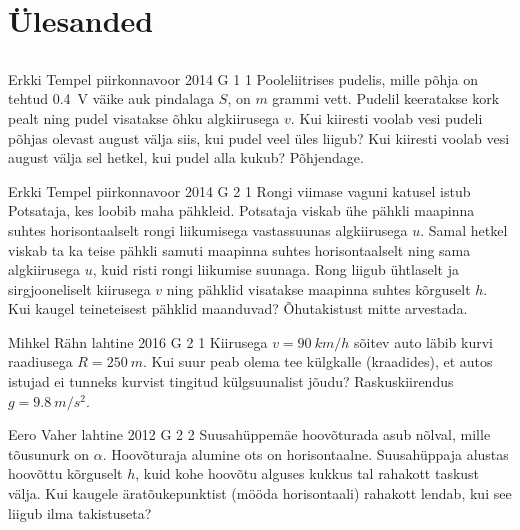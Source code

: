 \documentclass[11pt]{article}
\begin{document}
{        \section{Ülesanded}
        \ToggleStatement
        \subsection{\protect{}}

\graphicspath{{../problems/}}

{Erkki Tempel} %
{piirkonnavoor} %
{2014} %
{G 1} %
{1} %
{
\ifStatement
Pooleliitrises pudelis, mille põhja on tehtud \SI{0.4}{V} väike auk pindalaga $S$, on $m$ grammi vett. Pudelil keeratakse kork pealt ning pudel visatakse õhku algkiirusega $v$. Kui kiiresti voolab vesi pudeli põhjas olevast august välja siis, kui pudel veel üles liigub? Kui kiiresti voolab vesi august välja sel hetkel, kui pudel alla kukub? Põhjendage.
\fi
}

{Erkki Tempel} %
{piirkonnavoor} %
{2014} %
{G 2} %
{1} %
{
\ifStatement
Rongi viimase vaguni katusel istub Potsataja, kes loobib maha pähkleid. Potsataja viskab ühe pähkli maapinna suhtes horisontaalselt rongi liikumisega vastassuunas algkiirusega $u$. Samal hetkel viskab ta ka teise pähkli samuti maapinna suhtes horisontaalselt ning sama algkiirusega $u$, kuid risti rongi liikumise suunaga. Rong liigub ühtlaselt ja sirgjooneliselt kiirusega $v$ ning pähklid visatakse maapinna suhtes kõrguselt $h$. Kui kaugel teineteisest pähklid maanduvad? Õhutakistust mitte arvestada.
\fi
}

{Mihkel Rähn} %
{lahtine} %
{2016} %
{G 2} %
{1} %
{
\ifStatement
Kiirusega $v=\SI{90}{km/h}$ sõitev auto läbib kurvi raadiusega $R=\SI{250}{m}$. Kui suur peab olema tee külgkalle (kraadides), et autos istujad ei tunneks kurvist tingitud külgsuunalist jõudu? Raskuskiirendus $g=\SI{9.8}{m/s^{2}}$.
\fi
}

{Eero Vaher} %
{lahtine} %
{2012} %
{G 2} %
{2} %
{
\ifStatement
Suusahüppemäe hoovõturada asub nõlval, mille tõusunurk on $\alpha$. Hoovõturaja alumine
ots on horisontaalne. Suusahüppaja alustas hoovõttu kõrguselt $h$,
kuid kohe hoovõtu alguses kukkus tal rahakott taskust välja. Kui kaugele
äratõukepunktist (mööda
horisontaali) rahakott lendab, kui see liigub ilma takistuseta?
\fi
}

}
\end{document}
